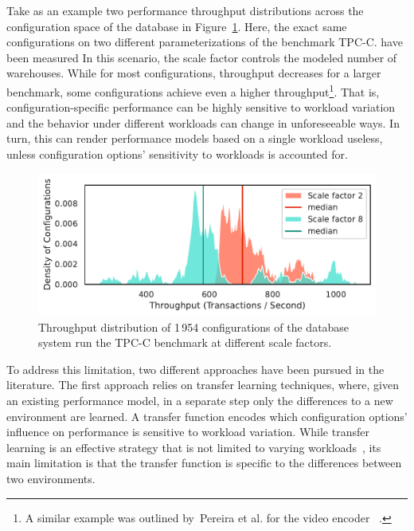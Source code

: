 {\color{edited}
Take as an example two performance throughput distributions across the configuration space of the database \htwo in Figure~\ref{fig:h2_intro}. Here,  the exact same configurations on two different parameterizations of the benchmark \textsf{TPC-C}. have been measured In this scenario, the scale factor controls the modeled number of warehouses. While for most configurations, throughput decreases for a larger benchmark, some configurations achieve even a higher throughput\footnote{A similar example was outlined by~Pereira et al. for the video encoder \xzwo~\cite{alves_sampling_2020}.}. That is, configuration-specific performance can be highly sensitive to workload variation and the behavior under different workloads can change in unforeseeable ways. In turn, this can render performance models based on a single workload useless, unless configuration options’ sensitivity to workloads is accounted for.
}
\begin{figure}
	\centering
	\includegraphics[width=0.99\linewidth]{images/h2_intro.pdf}
	\caption{Throughput distribution of 1\,954 configurations of the database system \htwo run the \textsf{TPC-C} benchmark at different scale factors.}
	\label{fig:h2_intro}
\end{figure}

To address this limitation, two different approaches have been pursued in the literature. 
The first approach relies on transfer learning techniques, where, given an existing performance model, in a separate step only the differences to a new environment are learned. A transfer function encodes which configuration options’ influence on performance is sensitive to workload variation. While transfer learning is an effective strategy that is not limited to varying workloads~\cite{jamshidi_learning_2018,jamishidi_transfer_2017,jamshidi_transfer_gp_2017,martin_transfer_2021,ding_bayesian_2020}, its main limitation is that the transfer function is specific to the differences between two environments.

